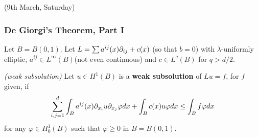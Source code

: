 \documentclass[12pt,a4paper]{article}
\begin{document}
\newday

(9th March, Saturday)

\subsubsection*{De Giorgi's Theorem, Part I}

Let $B= B(0,1)$. Let $L = \sum a^{ij}(x) \partial_{ij} + c(x)$ (so that $b=0$) with $\lambda$-uniformly elliptic, $a^{ij} \in L^{\infty}(B)$(not even continuous) and $c\in L^q(B)$ for $q> d/2$.
\s

 \emph{(weak subsolution)} Let $u\in H^1(B)$ is a \textbf{weak subsolution} of $Lu =f$, for $f$ given, if
\begin{align*}
\sum_{i,j=1}^d \int_B a^{ij}(x) \partial_{x_i} u \partial_{x_j} \varphi dx + \int_B c(x) u\varphi dx \leq \int_B f\varphi dx
\end{align*}
for any $\varphi \in H_0^1(B)$ such that $\varphi \geq 0$ in $B=B(0,1)$.
\s
\end{document}
